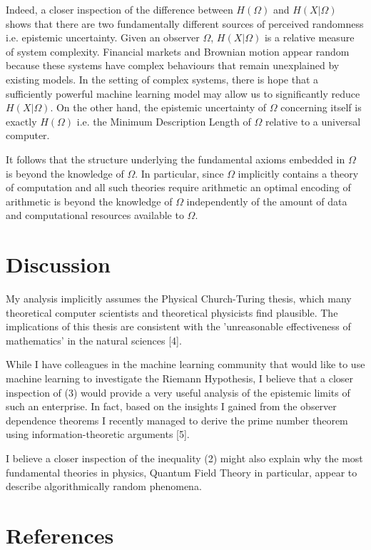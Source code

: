 \documentclass{article}
\begin{document}
Indeed, a closer inspection of the difference between $H(\Omega)$ and $H(X|\Omega)$ shows that there are two fundamentally different sources of perceived randomness i.e. epistemic uncertainty. Given an observer $\Omega$, $H(X|\Omega)$ is a relative measure of system complexity. Financial markets and Brownian motion appear random because these systems have complex behaviours that remain unexplained by existing models. In the setting of complex systems, there is hope that a sufficiently powerful machine learning model may allow us to significantly reduce $H(X|\Omega)$. On the other hand, the epistemic uncertainty of $\Omega$ concerning itself is exactly $H(\Omega)$ i.e. the Minimum Description Length of $\Omega$ relative to a universal computer.

It follows that the structure underlying the fundamental axioms embedded in $\Omega$ is beyond the knowledge of $\Omega$. In particular, since $\Omega$ implicitly contains a theory of computation and all such theories require arithmetic an optimal encoding of arithmetic is beyond the knowledge of $\Omega$ independently of the amount of data and computational resources available to $\Omega$.

\section{Discussion}

My analysis implicitly assumes the Physical Church-Turing thesis, which many theoretical computer scientists and theoretical physicists find plausible. The implications of this thesis are consistent with the 'unreasonable effectiveness of mathematics' in the natural sciences [4].

While I have colleagues in the machine learning community that would like to use machine learning to investigate the Riemann Hypothesis, I believe that a closer inspection of (3) would provide a very useful analysis of the epistemic limits of such an enterprise. In fact, based on the insights I gained from the observer dependence theorems I recently managed to derive the prime number theorem using information-theoretic arguments [5].

I believe a closer inspection of the inequality (2) might also explain why the most fundamental theories in physics, Quantum Field Theory in particular, appear to describe algorithmically random phenomena. 

\section*{References}
\end{document}
